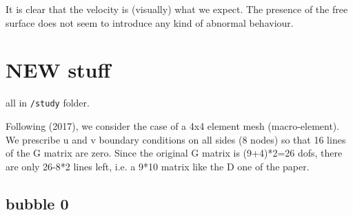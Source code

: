 It is clear that the velocity is (visually) what we expect. The presence of the free surface 
does not seem to introduce any kind of abnormal behaviour. 


\newpage
\section*{NEW stuff}

all in {\tt /study} folder.

Following \textcite{lami17} (2017), we consider the case of a 4x4 element mesh (macro-element).
We prescribe u and v boundary conditions on all sides (8 nodes) so that
16 lines of the G matrix are zero. Since the original G matrix is (9+4)*2=26 dofs, 
there are only 26-8*2 lines left, i.e. a 9*10 matrix like the D one of the paper.

\subsection*{bubble 0}


